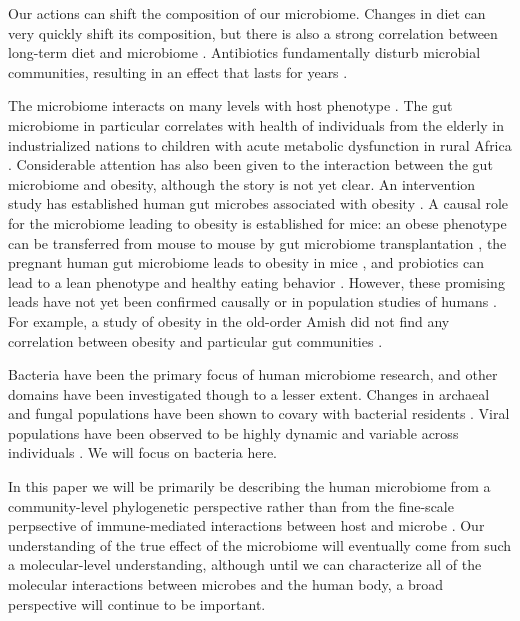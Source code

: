 \documentclass{amsart}
\begin{document}
Our actions can shift the composition of our microbiome.
Changes in diet can very quickly shift its composition, but there is also a strong correlation between long-term diet and microbiome \citep{li2009human,wu2011linking}.
Antibiotics fundamentally disturb microbial communities, resulting in an effect that lasts for years \citep{jernberg2007long,dethlefsen2008pervasive,jakobsson2010short,dethlefsen2011incomplete}.

The microbiome interacts on many levels with host phenotype \citep[reviewed in][]{cho2012human}.
The gut microbiome in particular correlates with health of individuals from the elderly in industrialized nations \citep{claesson2012gut} to children with acute metabolic dysfunction in rural Africa \citep{smith2013gut}.
Considerable attention has also been given to the interaction between the gut microbiome and obesity, although the story is not yet clear.
An intervention study has established human gut microbes associated with obesity \citep{ley2006microbial}.
A causal role for the microbiome leading to obesity is established for mice: an obese phenotype can be transferred from mouse to mouse by gut microbiome transplantation \citep{turnbaugh2006obesity}, the pregnant human gut microbiome leads to obesity in mice \citep{koren2012host}, and probiotics can lead to a lean phenotype and healthy eating behavior \citep{poutahidis2013microbial}.
However, these promising leads have not yet been confirmed causally or in population studies of humans \citep{zhao2013gut}.
For example, a study of obesity in the old-order Amish did not find any correlation between obesity and particular gut communities \citep{zupancic2012analysis}.

Bacteria have been the primary focus of human microbiome research, and other domains have been investigated though to a lesser extent.
Changes in archaeal and fungal populations have been shown to covary with bacterial residents \citep{hoffmann2013archaea}.
Viral populations have been observed to be highly dynamic and variable across individuals \citep{reyes2010viruses,minot2011human,minot2013rapid}.
We will focus on bacteria here.

In this paper we will be primarily be describing the human microbiome from a community-level phylogenetic perspective rather than from the fine-scale perpsective of immune-mediated interactions between host and microbe \citep[reviewed in][]{hooper2012interactions}.
Our understanding of the true effect of the microbiome will eventually come from such a molecular-level understanding, although until we can characterize all of the molecular interactions between microbes and the human body, a broad perspective will continue to be important.
\end{document}

